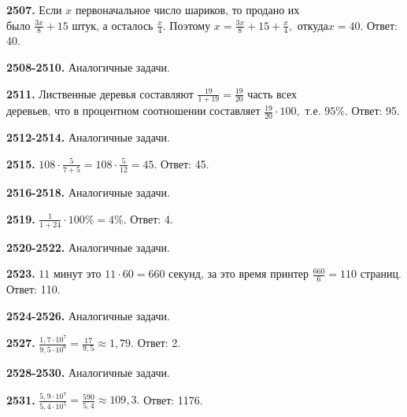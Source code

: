 \textbf{2507.} $\text{Если } x \text{ первоначальное число шариков, то продано их}$\newline$\text{было }\frac{3x}{8} + 15 \text{ штук, а осталось }\frac{x}{4}.\text{ Поэтому } x = \frac{3x}{8} + 15 + \frac{x}{4}, \text{ откуда}$\newline$ x = 40.$ \newline \null \hspace*{\fill} Ответ: 40.  

\textbf{2508-2510.} Аналогичные задачи.

\textbf{2511.} $\text{Лиственные деревья составляют } \frac{19}{1+19} = \frac{19}{20} \text{ часть всех}$\newline$\text{деревьев, что в процентном соотношении составляет } \frac{19}{20} \cdot 100, \text{ т.е. }$\newline$ 95\%$. \newline \null \hspace*{\fill} Ответ: 95. 

\textbf{2512-2514.} Аналогичные задачи.

\textbf{2515.} $108 \cdot \frac{5}{7+5} = 108 \cdot \frac{5}{12} = 45.$ \newline \null \hspace*{\fill} Ответ: 45. 

\textbf{2516-2518.} Аналогичные задачи.

\textbf{2519.} $\frac{1}{1+24} \cdot 100\% = 4\%.$ \null \hspace*{\fill} Ответ: 4. 

\textbf{2520-2522.} Аналогичные задачи.

\textbf{2523.} $11 \text{ минут это } 11 \cdot 60 = 660 \text{ секунд, за это время принтер}$\newline{} $\frac{660}{6} = 110 \text{ страниц}.$ \newline \null \hspace*{\fill} Ответ: 110. 

\textbf{2524-2526.} Аналогичные задачи.

\textbf{2527.} $\frac{1,7 \cdot 10^7}{9,5 \cdot 10^6} = \frac{17}{9,5} \approx 1,79.$ \newline \null \hspace*{\fill} Ответ: 2. 

\textbf{2528-2530.} Аналогичные задачи.

\textbf{2531.} $\frac{5,9 \cdot 10^7}{5,4 \cdot 10^5}=\frac{590}{5,4}\approx109,3.$ \newline \null \hspace*{\fill} Ответ: 1176. 

